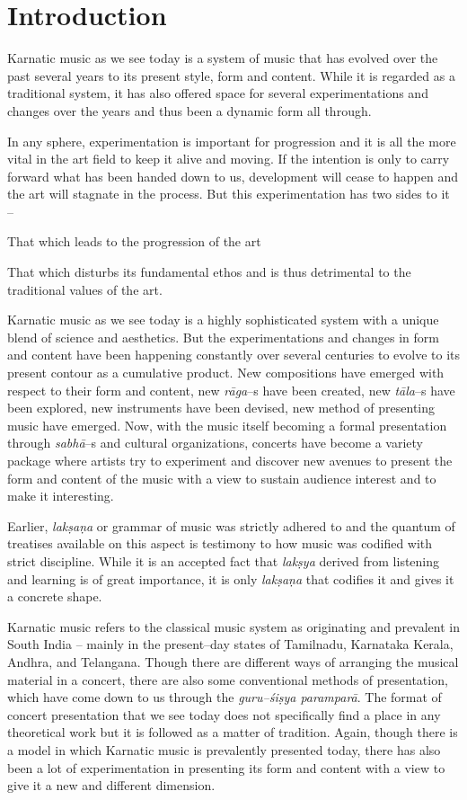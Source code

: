 \section*{Introduction}

Karnatic music as we see today is a system of music that has evolved over the past several years to its present style, form and content. While it is regarded as a traditional system, it has also offered space for several experimentations and changes over the years and thus been a dynamic form all through.

In any sphere, experimentation is important for progression and it is all the more vital in the art field to keep it alive and moving. If the intention is only to carry forward what has been handed down to us, development will cease to happen and the art will stagnate in the process. But this experimentation has two sides to it –

\item That which leads to the progression of the art

 \item That which disturbs its fundamental ethos and is thus detrimental to the traditional values of the art.

Karnatic music as we see today is a highly sophisticated system with a unique blend of science and aesthetics. But the experimentations and changes in form and content have been happening constantly over several centuries to evolve to its present contour as a cumulative product. New compositions have emerged with respect to their form and content, new \textit{rāga}–s have been created, new \textit{tāla}–s have been explored, new instruments have been devised, new method of presenting music have emerged. Now, with the music itself becoming a formal presentation through \textit{sabhā}–s and cultural organizations, concerts have become a variety package where artists try to experiment and discover new avenues to present the form and content of the music with a view to sustain audience interest and to make it interesting.

Earlier, \textit{lakṣaṇa} or grammar of music was strictly adhered to and the quantum of treatises available on this aspect is testimony to how music was codified with strict discipline. While it is an accepted fact that \textit{lakṣya} derived from listening and learning is of great importance, it is only \textit{lakṣaṇa} that codifies it and gives it a concrete shape.

Karnatic music refers to the classical music system as originating and prevalent in South India – mainly in the present–day states of Tamilnadu, Karnataka Kerala, Andhra, and Telangana. Though there are different ways of arranging the musical material in a concert, there are also some conventional methods of presentation, which have come down to us through the \textit{guru–śiṣya paramparā}. The format of concert presentation that we see today does not specifically find a place in any theoretical work but it is followed as a matter of tradition. Again, though there is a model in which Karnatic music is prevalently presented today, there has also been a lot of experimentation in presenting its form and content with a view to give it a new and different dimension.


